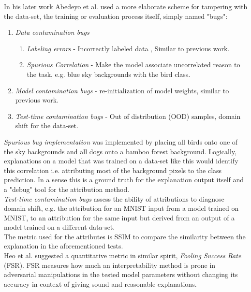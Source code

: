 \documentclass[12pt]{report}
\begin{document}
In his later work Abedeyo et al. \cite{DBLP:journals/corr/abs-2011-05429} used a more elaborate scheme for tampering with the data-set, the training or evaluation process itself, simply named "bugs":
\begin{enumerate}
	\item \textit{Data contamination bugs} 
	\begin{enumerate}
		\item \textit{Labeling errors} - Incorrectly labeled data , Similar to previous work.
		\item \textit{Spurious Correlation} - Make the model associate uncorrelated reason to the task, e.g. blue sky backgrounds with the bird class. 
	\end{enumerate}
	\item \textit{Model contamination bugs} - re-initialization of model weights, similar to previous work.
	\item \textit{Test-time contamination bugs} - Out of distribution (OOD) samples, domain shift for the data-set. 
\end{enumerate}

\textit{Spurious bug implementation} was implemented by placing all birds onto one of the sky backgrounds and all dogs onto a bamboo forest background. Logically, explanations on a model that was trained on a data-set like this would identify this correlation i.e. attributing most of the background pixels to the class prediction. In a sense this is a ground truth for the explanation output itself and a "debug" tool for the attribution method.\\

\textit{Test-time contamination bugs} assess the ability of attributions to diagnose domain shift, e.g. the attribution for an MNIST input from a model trained on MNIST, to an attribution for the same input but derived from an output of a model trained on a different data-set. \\


The metric used for the attributes is SSIM to compare the similarity between the explanation in the aforementioned tests.\\


Heo et al. \cite{DBLP:journals/corr/abs-1902-02041} suggested a quantitative metric in similar spirit, \textit{Fooling Success Rate} (FSR). FSR measures how much an interpretability method is prone in adversarial manipulations in the tested model parameters without changing its accuracy in context of giving sound and reasonable explanations.    
\end{document}
